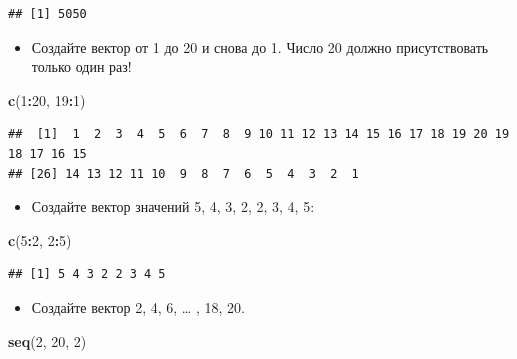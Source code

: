 \documentclass[]{book}
\newenvironment{Shaded}{\begin{snugshade}}{\end{snugshade}}
\newcommand{\KeywordTok}[1]{\textcolor[rgb]{0.13,0.29,0.53}{\textbf{#1}}}
\newcommand{\DecValTok}[1]{\textcolor[rgb]{0.00,0.00,0.81}{#1}}
\newcommand{\OperatorTok}[1]{\textcolor[rgb]{0.81,0.36,0.00}{\textbf{#1}}}
\newcommand{\NormalTok}[1]{#1}
\providecommand{\tightlist}{%
  \setlength{\itemsep}{0pt}\setlength{\parskip}{0pt}}
\begin{document}
\begin{verbatim}
## [1] 5050
\end{verbatim}

\begin{itemize}
\tightlist
\item
  Создайте вектор от 1 до 20 и снова до 1. Число 20 должно
  присутствовать только один раз!
\end{itemize}

\begin{Shaded}
\begin{Highlighting}[]
\KeywordTok{c}\NormalTok{(}\DecValTok{1}\OperatorTok{:}\DecValTok{20}\NormalTok{, }\DecValTok{19}\OperatorTok{:}\DecValTok{1}\NormalTok{)}
\end{Highlighting}
\end{Shaded}

\begin{verbatim}
##  [1]  1  2  3  4  5  6  7  8  9 10 11 12 13 14 15 16 17 18 19 20 19 18 17 16 15
## [26] 14 13 12 11 10  9  8  7  6  5  4  3  2  1
\end{verbatim}

\begin{itemize}
\tightlist
\item
  Создайте вектор значений 5, 4, 3, 2, 2, 3, 4, 5:
\end{itemize}

\begin{Shaded}
\begin{Highlighting}[]
\KeywordTok{c}\NormalTok{(}\DecValTok{5}\OperatorTok{:}\DecValTok{2}\NormalTok{, }\DecValTok{2}\OperatorTok{:}\DecValTok{5}\NormalTok{)}
\end{Highlighting}
\end{Shaded}

\begin{verbatim}
## [1] 5 4 3 2 2 3 4 5
\end{verbatim}

\begin{itemize}
\tightlist
\item
  Создайте вектор 2, 4, 6, \ldots{} , 18, 20.
\end{itemize}

\begin{Shaded}
\begin{Highlighting}[]
\KeywordTok{seq}\NormalTok{(}\DecValTok{2}\NormalTok{, }\DecValTok{20}\NormalTok{, }\DecValTok{2}\NormalTok{)}
\end{Highlighting}
\end{Shaded}
\end{document}
